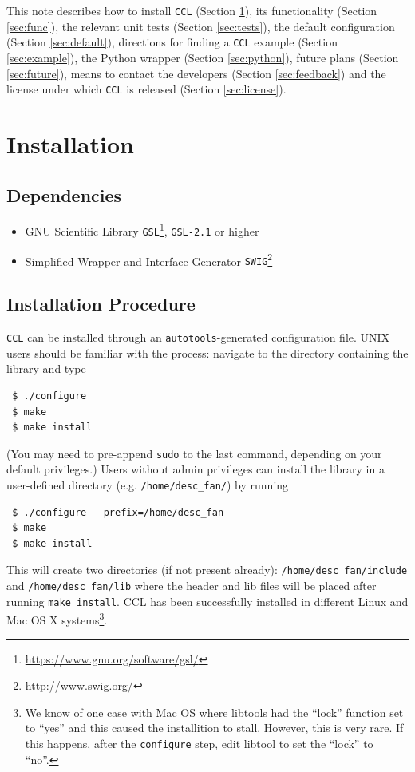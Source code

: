 \documentclass[\docopts]{\docclass}
\begin{document}
This note describes how to install {\tt CCL} (Section \ref{sec:install}), its functionality (Section \ref{sec:func}), the relevant unit tests (Section \ref{sec:tests}), the default configuration (Section \ref{sec:default}), directions for finding a {\tt CCL} example (Section \ref{sec:example}), the Python wrapper (Section \ref{sec:python}), future plans (Section \ref{sec:future}), means to contact the developers (Section \ref{sec:feedback}) and the license under which {\tt CCL} is released (Section \ref{sec:license}).

\section{Installation}
\label{sec:install}
\subsection{Dependencies}
\begin{itemize} 
\item GNU Scientific Library {\tt GSL}\footnote{\url{https://www.gnu.org/software/gsl/}}, {\tt GSL-2.1} or higher
\item Simplified Wrapper and Interface Generator {\tt SWIG}\footnote{\url{http://www.swig.org/}}
\end{itemize}
\subsection{Installation Procedure}
{\tt CCL} can be installed through an {\tt autotools}-generated configuration file. UNIX users should be familiar with the process: navigate to the directory containing the library and type
\begin{verbatim}
 $ ./configure
 $ make
 $ make install
\end{verbatim}
(You may need to pre-append {\tt sudo} to the last command, depending on your default privileges.) Users without admin privileges can install the library in a user-defined directory (e.g. {\tt /home/desc\_fan/}) by running
\begin{verbatim}
 $ ./configure --prefix=/home/desc_fan
 $ make
 $ make install
\end{verbatim}
This will create two directories (if not present already): {\tt /home/desc\_fan/include} and {\tt /home/desc\_fan/lib} where the header and lib files will be placed after running {\tt make install}. CCL has been successfully installed in different Linux and Mac OS X systems\footnote{We know of one case with Mac OS where libtools had the ``lock'' function set to ``yes'' and this caused the installition to stall. However, this is very rare. If this happens, after the {\tt configure} step, edit libtool to set the ``lock'' to ``no''.}.
\end{document}
